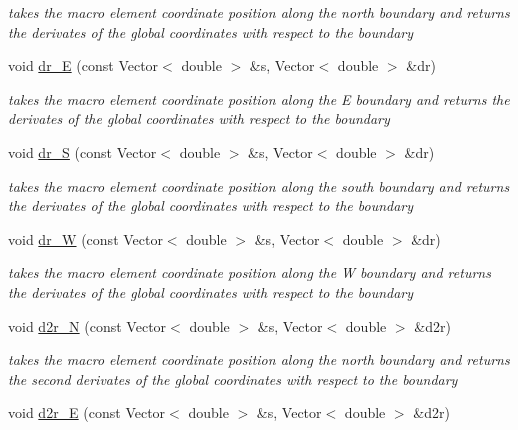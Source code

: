 \begin{DoxyCompactItemize}
\begin{DoxyCompactList}\small\item\em takes the macro element coordinate position along the north boundary and returns the derivates of the global coordinates with respect to the boundary \end{DoxyCompactList}\item 
void \hyperlink{classoomph_1_1TopologicallyRectangularDomain_a22b9364ef22563bea32aad2ff9e6851f}{dr\+\_\+E} (const Vector$<$ double $>$ \&s, Vector$<$ double $>$ \&dr)
\begin{DoxyCompactList}\small\item\em takes the macro element coordinate position along the E boundary and returns the derivates of the global coordinates with respect to the boundary \end{DoxyCompactList}\item 
void \hyperlink{classoomph_1_1TopologicallyRectangularDomain_a24a20bc9749166ca61bd4373bc381680}{dr\+\_\+S} (const Vector$<$ double $>$ \&s, Vector$<$ double $>$ \&dr)
\begin{DoxyCompactList}\small\item\em takes the macro element coordinate position along the south boundary and returns the derivates of the global coordinates with respect to the boundary \end{DoxyCompactList}\item 
void \hyperlink{classoomph_1_1TopologicallyRectangularDomain_a91b92399343513aed5cfa65a8377b01a}{dr\+\_\+W} (const Vector$<$ double $>$ \&s, Vector$<$ double $>$ \&dr)
\begin{DoxyCompactList}\small\item\em takes the macro element coordinate position along the W boundary and returns the derivates of the global coordinates with respect to the boundary \end{DoxyCompactList}\item 
void \hyperlink{classoomph_1_1TopologicallyRectangularDomain_a6cc86191b0085c8d7b3f05985cf647c8}{d2r\+\_\+N} (const Vector$<$ double $>$ \&s, Vector$<$ double $>$ \&d2r)
\begin{DoxyCompactList}\small\item\em takes the macro element coordinate position along the north boundary and returns the second derivates of the global coordinates with respect to the boundary \end{DoxyCompactList}\item 
void \hyperlink{classoomph_1_1TopologicallyRectangularDomain_ab40347c05811cfa8a76394204fd0611a}{d2r\+\_\+E} (const Vector$<$ double $>$ \&s, Vector$<$ double $>$ \&d2r)

\end{DoxyCompactItemize}
